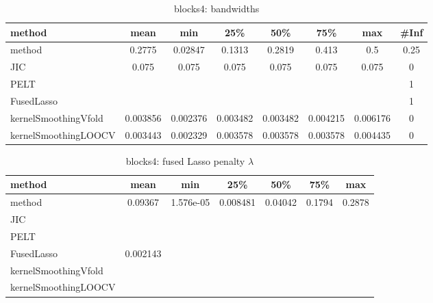 \begin{table}[ht]
\centering
\begin{tabular}{l|c|ccccc|c}
  \hline
method & mean & min & 25\% & 50\% & 75\% & max & \#Inf \\ 
  \hline
method & 0.2775 & 0.02847 & 0.1313 & 0.2819 & 0.413 &   0.5 & 0.25 \\ 
  JIC & 0.075 & 0.075 & 0.075 & 0.075 & 0.075 & 0.075 &   0 \\ 
  PELT &  &  &  &  &  &  &   1 \\ 
  FusedLasso &  &  &  &  &  &  &   1 \\ 
  kernelSmoothingVfold & 0.003856 & 0.002376 & 0.003482 & 0.003482 & 0.004215 & 0.006176 &   0 \\ 
  kernelSmoothingLOOCV & 0.003443 & 0.002329 & 0.003578 & 0.003578 & 0.003578 & 0.004435 &   0 \\ 
   \hline
\end{tabular}
\caption{blocks4: bandwidths} 
\label{tab:blocks4Bandwidths}
\end{table}
\begin{table}[ht]
\centering
\begin{tabular}{l|c|ccccc}
  \hline
method & mean & min & 25\% & 50\% & 75\% & max \\ 
  \hline
method & 0.09367 & 1.576e-05 & 0.008481 & 0.04042 & 0.1794 & 0.2878 \\ 
  JIC &  &  &  &  &  &  \\ 
  PELT &  &  &  &  &  &  \\ 
  FusedLasso & 0.002143 &  &  &  &  &  \\ 
  kernelSmoothingVfold &  &  &  &  &  &  \\ 
  kernelSmoothingLOOCV &  &  &  &  &  &  \\ 
   \hline
\end{tabular}
\caption{blocks4: fused Lasso penalty $\lambda$} 
\label{tab:blocks4Lambdas}
\end{table}
